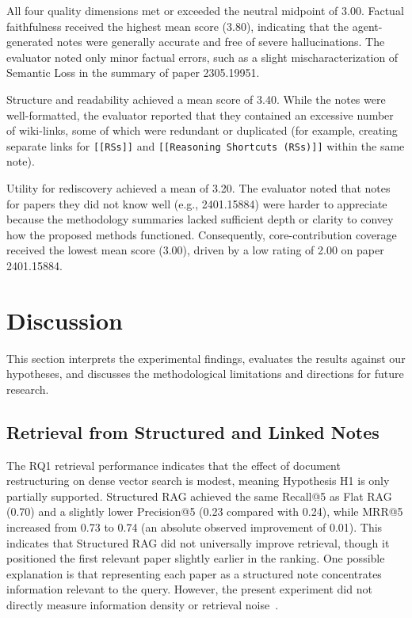 \documentclass[runningheads]{llncs}
\begin{document}
All four quality dimensions met or exceeded the neutral midpoint of 3.00. Factual faithfulness received the highest mean score (3.80), indicating that the agent-generated notes were generally accurate and free of severe hallucinations. The evaluator noted only minor factual errors, such as a slight mischaracterization of Semantic Loss in the summary of paper 2305.19951.

Structure and readability achieved a mean score of 3.40. While the notes were well-formatted, the evaluator reported that they contained an excessive number of wiki-links, some of which were redundant or duplicated (for example, creating separate links for \texttt{[[RSs]]} and \texttt{[[Reasoning Shortcuts (RSs)]]} within the same note).

Utility for rediscovery achieved a mean of 3.20. The evaluator noted that notes for papers they did not know well (e.g., 2401.15884) were harder to appreciate because the methodology summaries lacked sufficient depth or clarity to convey how the proposed methods functioned. Consequently, core-contribution coverage received the lowest mean score (3.00), driven by a low rating of 2.00 on paper 2401.15884.


\section{Discussion}
\label{sec:discussion}

This section interprets the experimental findings, evaluates the results against our hypotheses, and discusses the methodological limitations and directions for future research.

\subsection{Retrieval from Structured and Linked Notes}
The RQ1 retrieval performance indicates that the effect of document restructuring on dense vector search is modest, meaning Hypothesis H1 is only partially supported. Structured RAG achieved the same Recall@5 as Flat RAG (0.70) and a slightly lower Precision@5 (0.23 compared with 0.24), while MRR@5 increased from 0.73 to 0.74 (an absolute observed improvement of 0.01). This indicates that Structured RAG did not universally improve retrieval, though it positioned the first relevant paper slightly earlier in the ranking. One possible explanation is that representing each paper as a structured note concentrates information relevant to the query. However, the present experiment did not directly measure information density or retrieval noise~\cite{sarthi2024raptor,lewis2020retrieval}.
\end{document}
